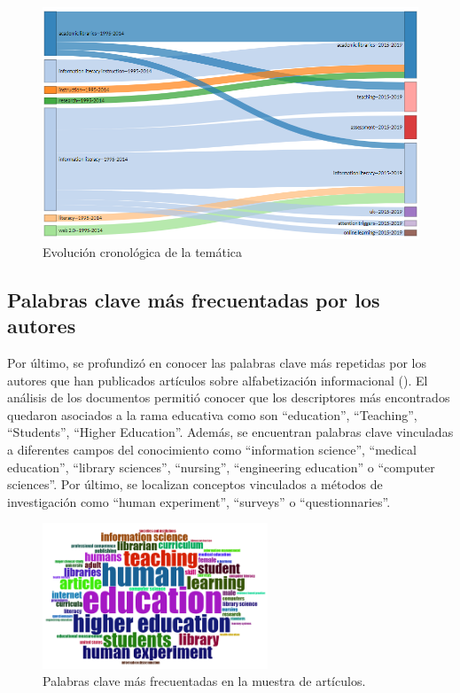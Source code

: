 \documentclass{textolivre}
\begin{document}
\begin{figure}[h!]
 \centering
 \includegraphics[width=\textwidth]{fig4.png}
 \caption{Evolución cronológica de la temática}
 \label{fig4}
\end{figure}

\subsection{Palabras clave más frecuentadas por los autores}
Por último, se profundizó en conocer las palabras clave más repetidas por los autores que han publicados artículos sobre alfabetización informacional (). El análisis de los documentos permitió conocer que los descriptores más encontrados quedaron asociados a la rama educativa como son “education”, “Teaching”, “Students”, “Higher Education”. Además, se encuentran palabras clave vinculadas a diferentes campos del conocimiento como “information science”, “medical education”, “library sciences”, “nursing”, “engineering education” o  “computer sciences”. Por último, se localizan conceptos vinculados a métodos de investigación como “human experiment”, “surveys” o “questionnaries”.

\begin{figure}[h!]
 \centering
 \includegraphics[width=0.6\textwidth]{fig5.png}
 \caption{Palabras clave más frecuentadas en la muestra de artículos.}
 \label{fig5}
\end{figure}
\end{document}
